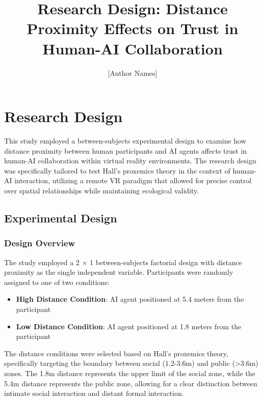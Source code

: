 \documentclass[12pt]{article}
\title{\textbf{Research Design: Distance Proximity Effects on Trust in Human-AI Collaboration}}
\author{[Author Names]}
\date{}
\begin{document}
\maketitle

\section{Research Design}

This study employed a between-subjects experimental design to examine how distance proximity between human participants and AI agents affects trust in human-AI collaboration within virtual reality environments. The research design was specifically tailored to test Hall's proxemics theory in the context of human-AI interaction, utilizing a remote VR paradigm that allowed for precise control over spatial relationships while maintaining ecological validity.

\subsection{Experimental Design}

\subsubsection{Design Overview}

The study employed a 2 × 1 between-subjects factorial design with distance proximity as the single independent variable. Participants were randomly assigned to one of two conditions:

\begin{itemize}
    \item \textbf{High Distance Condition}: AI agent positioned at 5.4 meters from the participant
    \item \textbf{Low Distance Condition}: AI agent positioned at 1.8 meters from the participant
\end{itemize}

The distance conditions were selected based on Hall's proxemics theory, specifically targeting the boundary between social (1.2-3.6m) and public (>3.6m) zones. The 1.8m distance represents the upper limit of the social zone, while the 5.4m distance represents the public zone, allowing for a clear distinction between intimate social interaction and distant formal interaction.
\end{document}
